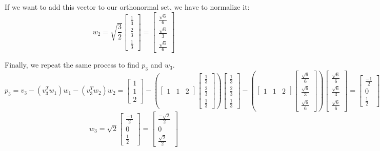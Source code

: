 \begin{enumerate}
{If we want to add this vector to our orthonormal set, we have to normalize it:
\[w_2 = \sqrt{\frac{3}{2}}\begin{bmatrix}\frac{1}{3}\\\frac{2}{3}\\\frac{1}{3}\end{bmatrix} = \begin{bmatrix}\frac{\sqrt{6}}{6}\\\frac{\sqrt{6}}{3}\\\frac{\sqrt{6}}{6}\end{bmatrix}
\]

Finally, we repeat the same process to find $p_3$ and $w_3$.
\[p_3 = v_3 - (v_3^T w_1)w_1 - (v_3^T w_2)w_2 = \begin{bmatrix}1\\1\\2\end{bmatrix} - (\begin{bmatrix}1 & 1 & 2\end{bmatrix}\begin{bmatrix}\frac{1}{3}\\\frac{2}{3}\\\frac{1}{3}\end{bmatrix})\begin{bmatrix}\frac{1}{3}\\\frac{2}{3}\\\frac{1}{3}\end{bmatrix} - (\begin{bmatrix}1 & 1 & 2\end{bmatrix}\begin{bmatrix}\frac{\sqrt{6}}{6}\\\frac{\sqrt{6}}{3}\\\frac{\sqrt{6}}{6}\end{bmatrix})\begin{bmatrix}\frac{\sqrt{6}}{6}\\\frac{\sqrt{6}}{3}\\\frac{\sqrt{6}}{6}\end{bmatrix} = \begin{bmatrix}\frac{-1}{2}\\0\\\frac{1}{2}\end{bmatrix}\]
\[w_3 = \sqrt{2}\begin{bmatrix}\frac{-1}{2}\\0\\\frac{1}{2}\end{bmatrix} = \begin{bmatrix}\frac{-\sqrt{2}}{2}\\0\\\frac{\sqrt{2}}{2}\end{bmatrix}\]
}


    
\end{enumerate}